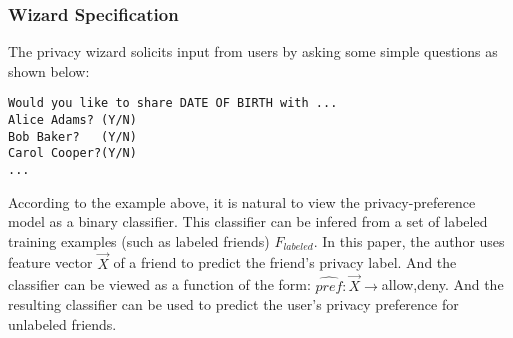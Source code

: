 \documentclass{beamer}
\begin{document}
%
\begin{frame}[fragile] %
\frametitle{Wizard Specification}
The privacy wizard solicits input from users by asking some simple
questions as shown below: 
\begin{example}
\begin{verbatim}
Would you like to share DATE OF BIRTH with ...
Alice Adams? (Y/N)
Bob Baker?   (Y/N)
Carol Cooper?(Y/N)
...
\end{verbatim} 
\end{example} 
According to the example above, it is natural to view the
privacy-preference model as a binary classifier. This classifier can
be infered from a set of labeled training examples (such as labeled
friends) $F_{labeled}$. In this paper, the author uses feature vector
$\vec{X}$ of a friend to predict the friend's privacy label. And the
classifier can be viewed as a function of the form:
$\widehat{pref}:\vec{X}\rightarrow${allow,deny}. And the resulting
classifier can be used to predict the user's privacy preference for
unlabeled friends. 
\end{frame}
\end{document}
